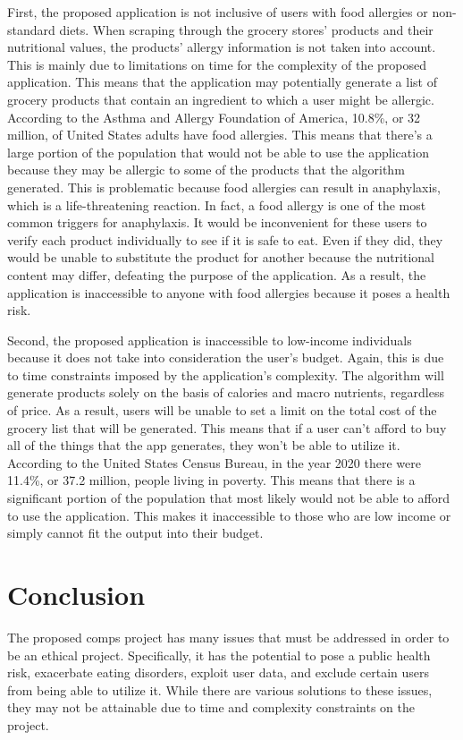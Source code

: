 \documentclass[10pt,twocolumn]{article}
\begin{document}
First, the proposed application is not inclusive of users with food allergies or non-standard diets. When scraping through the grocery stores’ products and their nutritional values, the products’ allergy information is not taken into account. This is mainly due to limitations on time for the complexity of the proposed application. This means that the application may potentially generate a list of grocery products that contain an ingredient to which a user might be allergic. According to the Asthma and Allergy Foundation of America, 10.8\%, or 32 million, of United States adults have food allergies.\cite{asthma and allergy foundation of america_2021} This means that there’s a large portion of the population that would not be able to use the application because they may be allergic to some of the products that the algorithm generated. This is problematic because food allergies can result in anaphylaxis, which is a life-threatening reaction. In fact, a food allergy is one of the most common triggers for anaphylaxis.\cite{asthma and allergy foundation of america_2021} It would be inconvenient for these users to verify each product individually to see if it is safe to eat. Even if they did, they would be unable to substitute the product for another because the nutritional content may differ, defeating the purpose of the application. As a result, the application is inaccessible to anyone with food allergies because it poses a health risk. 

Second, the proposed application is inaccessible to low-income individuals because it does not take into consideration the user’s budget. Again, this is due to time constraints imposed by the application's complexity. The algorithm will generate products solely on the basis of calories and macro nutrients, regardless of price. As a result, users will be unable to set a limit on the total cost of the grocery list that will be generated. This means that if a user can't afford to buy all of the things that the app generates, they won't be able to utilize it. According to the United States Census Bureau, in the year 2020 there were 11.4\%, or 37.2 million, people living in poverty.\cite{bureau_2022} This means that there is a significant portion of the population that most likely would not be able to afford to use the application. This makes it inaccessible to those who are low income or simply cannot fit the output into their budget. 

\section{Conclusion}
The proposed comps project has many issues that must be addressed in order to be an ethical project. Specifically, it has the potential to pose a public health risk, exacerbate eating disorders, exploit user data, and exclude certain users from being able to utilize it. While there are various solutions to these issues, they may not be attainable due to time and complexity constraints on the project. 

\printbibliography
\end{document}
